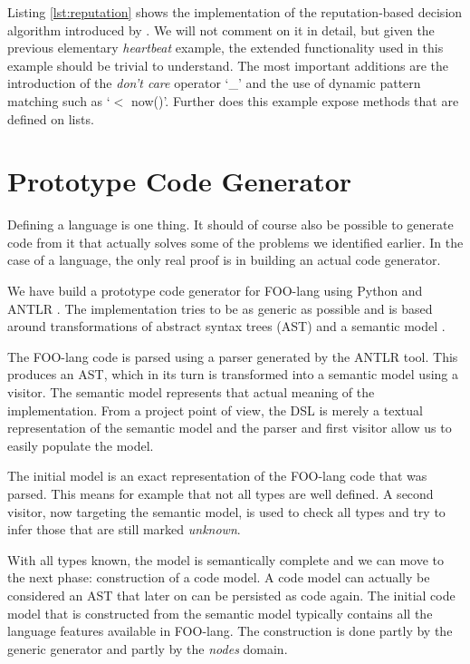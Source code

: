 \documentclass[conference]{IEEEtran}
\begin{document}
Listing \ref{lst:reputation} shows the implementation of the reputation-based
decision algorithm introduced by \cite{ganeriwal2008reputation}. We will not
comment on it in detail, but given the previous elementary \emph{heartbeat}
example, the extended functionality used in this example should be trivial to
understand. The most important additions are the introduction of the
\emph{don't care} operator `\_' and the use of dynamic pattern matching such as
`$<$ now()'. Further does this example expose methods that are defined on lists.

\section{Prototype Code Generator}
\label{section:prototype}

Defining a language is one thing. It should of course also be possible to
generate code from it that actually solves some of the problems we identified
earlier. In the case of a language, the only real proof is in building an
actual code generator.

We have build a prototype code generator for FOO-lang using Python and ANTLR
\cite{antlr3}. The implementation tries to be as generic as possible and is
based around transformations of abstract syntax trees (AST) and a semantic
model \cite{fowler2010domain}.

The FOO-lang code is parsed using a parser generated by the ANTLR tool. This
produces an AST, which in its turn is transformed into a semantic model using a
visitor. The semantic model represents that actual meaning of the
implementation. From a project point of view, the DSL is merely a textual
representation of the semantic model and the parser and first visitor allow us
to easily populate the model.

The initial model is an exact representation of the FOO-lang code that was
parsed. This means for example that not all types are well defined. A second
visitor, now targeting the semantic model, is used to check all types and try
to infer those that are still marked \emph{unknown}.

With all types known, the model is semantically complete and we can move to the
next phase: construction of a code model. A code model can actually be
considered an AST that later on can be persisted as code again. The initial
code model that is constructed from the semantic model typically contains all
the language features available in FOO-lang. The construction is done partly by
the generic generator and partly by the \emph{nodes} domain.
\end{document}
